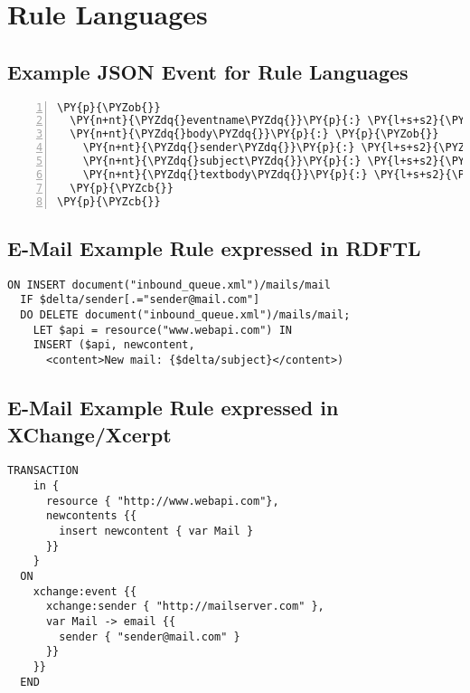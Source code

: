
\chapter{Rule Languages}

\section{Example JSON Event for Rule Languages}
\label{lst:JSONEvent}
\begin{Verbatim}[frame=single,fontsize=\footnotesize,commandchars=\\\{\},numbers=left,firstnumber=1,stepnumber=1,xleftmargin
=.3in]
\PY{p}{\PYZob{}}
  \PY{n+nt}{\PYZdq{}eventname\PYZdq{}}\PY{p}{:} \PY{l+s+s2}{\PYZdq{}email\PYZdq{}}\PY{p}{,}
  \PY{n+nt}{\PYZdq{}body\PYZdq{}}\PY{p}{:} \PY{p}{\PYZob{}}
    \PY{n+nt}{\PYZdq{}sender\PYZdq{}}\PY{p}{:} \PY{l+s+s2}{\PYZdq{}sender@mail.com\PYZdq{}}\PY{p}{,}
    \PY{n+nt}{\PYZdq{}subject\PYZdq{}}\PY{p}{:} \PY{l+s+s2}{\PYZdq{}Important subject!\PYZdq{}}\PY{p}{,}
    \PY{n+nt}{\PYZdq{}textbody\PYZdq{}}\PY{p}{:} \PY{l+s+s2}{\PYZdq{}Hi User,\PYZbs{}n\PYZbs{}nThis is a lengthy mail body\PYZdq{}}
  \PY{p}{\PYZcb{}}
\PY{p}{\PYZcb{}}
\end{Verbatim}


\section{E-Mail Example Rule expressed in RDFTL}
\label{lst:MailRDF}
\begin{lstlisting}[nolol,float=h,language=RDF]
  ON INSERT document("inbound_queue.xml")/mails/mail
  IF $delta/sender[.="sender@mail.com"]
  DO DELETE document("inbound_queue.xml")/mails/mail;
    LET $api = resource("www.webapi.com") IN
    INSERT ($api, newcontent,
      <content>New mail: {$delta/subject}</content>)
\end{lstlisting}



\section{E-Mail Example Rule expressed in XChange/Xcerpt}
\label{lst:MailXChange}
\begin{lstlisting}[nolol,float=h!,language=XChange]
  TRANSACTION
    in {
      resource { "http://www.webapi.com"},
      newcontents {{
        insert newcontent { var Mail }
      }}
    }
  ON
    xchange:event {{
      xchange:sender { "http://mailserver.com" },
      var Mail -> email {{
        sender { "sender@mail.com" }
      }}
    }}
  END
\end{lstlisting}


